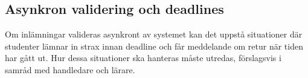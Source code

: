\subsection{Asynkron validering och deadlines}

Om inlämningar valideras asynkront av systemet kan det uppstå situationer där studenter lämnar in strax innan deadline och får meddelande om retur när tiden har gått ut. Hur dessa situationer ska hanteras måste utredas, förslagsvis i samråd med handledare och lärare.